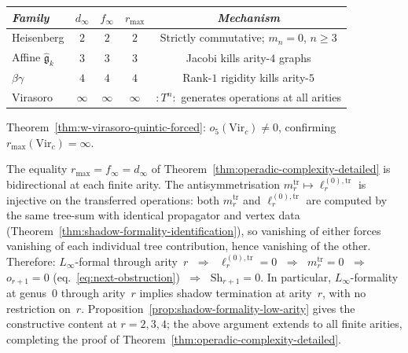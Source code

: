 \begin{example}
\label{ex:operadic-complexity-verification}
\begin{center}
\small
\renewcommand{\arraystretch}{1.15}
\begin{tabular}{lcccc}
\toprule
\emph{Family} &
$d_\infty$ &
$f_\infty$ &
$r_{\max}$ &
\emph{Mechanism} \\
\midrule
Heisenberg &
  $2$ & $2$ & $2$ &
  Strictly commutative; $m_n = 0$, $n \geq 3$ \\
Affine $\hat{\mathfrak{g}}_k$ &
  $3$ & $3$ & $3$ &
  Jacobi kills arity-$4$ graphs \\
$\beta\gamma$ &
  $4$ & $4$ & $4$ &
  Rank-$1$ rigidity kills arity-$5$ \\
Virasoro &
  $\infty$ & $\infty$ & $\infty$ &
  $:T^n:$ generates operations at all arities \\
\bottomrule
\end{tabular}
\end{center}
Theorem~\textup{\ref{thm:w-virasoro-quintic-forced}}:
$o_5(\mathrm{Vir}_c) \neq 0$, confirming
$r_{\max}(\mathrm{Vir}_c) = \infty$.
\end{example}

\begin{remark}
\label{rem:operadic-complexity-converse}
The equality $r_{\max} = f_\infty = d_\infty$ of
Theorem~\ref{thm:operadic-complexity-detailed} is
bidirectional at each finite arity.  The antisymmetrisation
$m_r^{\mathrm{tr}} \mapsto \ell_r^{(0),\mathrm{tr}}$ is
injective on the transferred operations: both
$m_r^{\mathrm{tr}}$ and $\ell_r^{(0),\mathrm{tr}}$ are
computed by the same tree-sum with identical propagator and
vertex data
(Theorem~\ref{thm:shadow-formality-identification}), so
vanishing of either forces vanishing of each individual tree
contribution, hence vanishing of the other.  Therefore:
$L_\infty$-formal through arity~$r$
$\;\Rightarrow\;$
$\ell_r^{(0),\mathrm{tr}} = 0$
$\;\Rightarrow\;$
$m_r^{\mathrm{tr}} = 0$
$\;\Rightarrow\;$
$o_{r+1} = 0$
\textup{(}eq.~\eqref{eq:next-obstruction}\textup{)}
$\;\Rightarrow\;$
$\mathrm{Sh}_{r+1} = 0$.
In particular, $L_\infty$-formality at genus~$0$ through
arity~$r$ implies shadow termination at arity~$r$, with
no restriction on~$r$.
Proposition~\ref{prop:shadow-formality-low-arity} gives the
constructive content at $r = 2, 3, 4$; the above argument
extends to all finite arities, completing the proof of
Theorem~\ref{thm:operadic-complexity-detailed}.
\end{remark}

